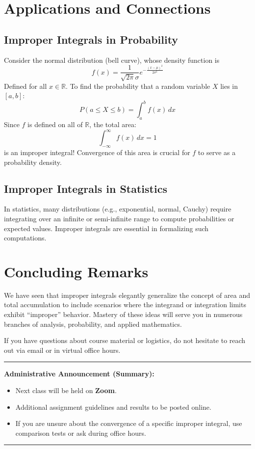\documentclass[11pt,oneside]{article}
\theoremstyle{definition}
\theoremstyle{remark}
\begin{document}
\section{Applications and Connections}

\subsection{Improper Integrals in Probability}

Consider the normal distribution (bell curve), whose density function is 
\[
f(x) = \frac{1}{\sqrt{2\pi}\sigma} e^{-\frac{(x-\mu)^2}{2\sigma^2}}
\]
Defined for all $x \in \mathbb{R}$. To find the probability that a random variable $X$ lies in $[a,b]$:
\[
P(a \leq X \leq b) = \int_a^b f(x)\,dx
\]
Since $f$ is defined on all of $\mathbb{R}$, the total area:
\[
\int_{-\infty}^\infty f(x)\,dx = 1
\]
is an improper integral! Convergence of this area is crucial for $f$ to serve as a probability density.

\subsection{Improper Integrals in Statistics}

In statistics, many distributions (e.g., exponential, normal, Cauchy) require integrating over an infinite or semi-infinite range to compute probabilities or expected values. Improper integrals are essential in formalizing such computations.

\section{Concluding Remarks}

We have seen that improper integrals elegantly generalize the concept of area and total accumulation to include scenarios where the integrand or integration limits exhibit ``improper'' behavior. Mastery of these ideas will serve you in numerous branches of analysis, probability, and applied mathematics.

If you have questions about course material or logistics, do not hesitate to reach out via email or in virtual office hours.

\medskip

\hrule
\vspace{0.5em}
\noindent
\textbf{Administrative Announcement (Summary):}
\begin{itemize}
    \item Next class will be held on \textbf{Zoom}.
    \item Additional assignment guidelines and results to be posted online.
    \item If you are unsure about the convergence of a specific improper integral, use comparison tests or ask during office hours.
\end{itemize}
\vspace{0.5em}
\hrule
\end{document}
